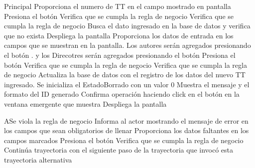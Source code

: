 
\begin{UCtrayectoria}{Principal}
		\UCpaso[\UCactor] Proporciona el numero de TT en el campo mostrado en pantalla 
		\UCpaso[\UCactor] Presiona el botón  
		\UCpaso[\UCsist] Verifica que se cumpla la regla de negocio  
		\UCpaso[\UCsist] Verifica que se cumpla la regla de negocio  
		\UCpaso[\UCsist] Busca el dato ingresado en la base de datos  y verifica que no exista 
		\UCpaso[\UCsist] Despliega la pantalla 
		\UCpaso[\UCactor] Proporciona los datos de entrada en los campos que se muestran en la pantalla. Los autores serán agregados presionando el botón . y los Direcotres serán agregados presionando el botón 
		\UCpaso[\UCactor] Presiona el botón  
		\UCpaso[\UCsist] Verifica que se cumpla la regla de negocio  
		\UCpaso[\UCsist] Verifica que se cumpla la regla de negocio  
		\UCpaso[\UCsist] Actualiza la base de datos con el registro de los datos del nuevo TT ingresado. Se inicializa el EstadoBorrado con un valor 0
		\UCpaso[\UCsist] Muestra el mensaje  y el formato del ID generado
		\UCpaso[\UCactor] Confirma operación haciendo click en el botón  en la ventana emergente que muestra
		\UCpaso[\UCsist] Despliega la pantalla 
\end{UCtrayectoria}



\begin{UCtrayectoriaA}{A}{Se viola la regla de negocio }	
			\UCpaso[\UCsist] Informa al actor mostrando el mensaje de error  en los campos que sean obligatorios de llenar
			\UCpaso[\UCactor] Proporciona los datos faltantes en los campos marcados 
			\UCpaso[\UCactor] Presiona el botón  
			\UCpaso[\UCactor] Verifica que se cumpla la regla de negocio  
			\UCpaso[\UCsist] Continúa trayectoria con el siguiente paso de la trayectoria que invocó esta trayectoria alternativa
\end{UCtrayectoriaA}

